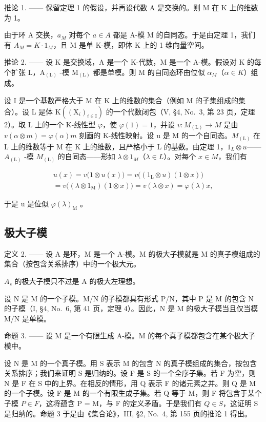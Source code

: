 推论 1. —— 保留定理 1 的假设，并再设代数 A 是交换的。则 M 在 K 上的维数为 1。

由于环 A 交换，\(a_{M}\) 对每个 \(a \in A\) 都是 A-模 M 的自同态。于是由定理 1，我们有 \(A_{M} = K \cdot 1_{M}\)，且 M 是单 K-模，即体 K 上的 1 维向量空间。

推论 2. —— 设 K 是交换域，A 是一个 K-代数，M 是一个 A-模。假设对 K 的每个扩张 L，\(\mathrm{A}_{(\mathrm{L})}\) -模 \(\mathrm{M}_{(\mathrm{L})}\) 都是单模。则 M 的自同态环由位似 \(\alpha_{M}\)（\(\alpha \in K\)）组成。

设 I 是一个基数严格大于 M 在 K 上的维数的集合（例如 M 的子集组成的集合）。设 L 是体 \(\mathrm{K}((\mathrm{X}_{i})_{i\in\mathrm{I}})\) 的一个代数闭包（V, §4, No.~3, 第 23 页，定理 2）。取 L 上的一个 K-线性型 \(\varphi\)，使 \(\varphi(1)=1\)，并设 \(v:M_{(\mathrm{L})}\to M\) 是由 \(v(\alpha\otimes m)=\varphi(\alpha)m\) 刻画的 K-线性映射。设 u 是 M 的一个自同态。\(M_{(\mathrm{L})}\) 在 L 上的维数等于 M 在 K 上的维数，且严格小于 L 的基数。由定理 1，\(1_{L}\otimes u\)——\(A_{(\mathrm{L})}\) -模 \(M_{(\mathrm{L})}\) 的自同态——形如 \(\lambda\otimes1_{M}\)（\(\lambda\in L\)）。对每个 \(x\in M\)，我们有

\[
\begin{array}{c} u (x) = v \bigl (1 \otimes u (x) \bigr) = v \bigl ((1 _ {\mathrm{L}} \otimes u) (1 \otimes x) \bigr) \\ = v \bigl ((\lambda \otimes 1 _ {\mathrm{M}}) (1 \otimes x) \bigr) = v (\lambda \otimes x) = \varphi (\lambda) x, \end{array}
\]

于是 u 是位似 \(\varphi(\lambda)_{\mathrm{M}}\) 。

\subsection{极大子模}

定义 2. —— 设 A 是环，M 是一个 A-模。M 的极大子模就是 M 的真子模组成的集合（按包含关系排序）中的一个极大元。

\(A_{s}\) 的极大子模只不过是 A 的极大左理想。

设 N 是 M 的一个子模。M/N 的子模都具有形式 P/N，其中 P 是 M 的包含 N 的子模（I, §4, No.~6, 第 41 页，定理 4）。因此，N 是 M 的极大子模当且仅当模 M/N 是单模。

命题 3. —— 设 M 是一个有限生成 A-模。M 的每个真子模都包含在某个极大子模中。

设 N 是 M 的一个真子模。用 S 表示 M 的包含 N 的真子模组成的集合，按包含关系排序；我们来证明 S 是归纳的。设 F 是 S 的一个全序子集。若 F 为空，则 N 是 F 在 S 中的上界。在相反的情形，用 Q 表示 F 的诸元素之并。则 Q 是 M 的一个子模。设 F 是 M 的一个有限生成子集。若 Q 等于 M，则 F 将包含于某个子模 \(P \in F\)，这将蕴含 P = M，与 F 的定义矛盾。于是我们有 \(Q \in S\)，这证明 S 是归纳的。命题 3 于是由《集合论》，III, §2, No.~4, 第 155 页的推论 1 得出。

